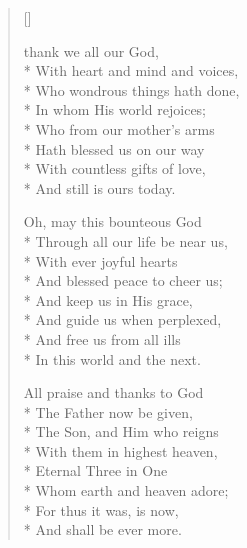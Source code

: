 \newHymn


\begin{verse}[\versewidth]

\begin{altverse}
 thank we all our God,\\*
With heart and mind and voices,\\*
Who wondrous things hath done,\\*
In whom His world rejoices;\\*
Who from our mother's arms\\*
Hath blessed us on our way\\*
With countless gifts of love,\\*
And still is ours today.
\end{altverse}

\begin{altverse}
Oh, may this bounteous God\\*
Through all our life be near us,\\*
With ever joyful hearts\\*
And blessed peace to cheer us;\\*
And keep us in His grace,\\*
And guide us when perplexed,\\*
And free us from all ills\\*
In this world and the next.
\end{altverse}

\begin{altverse}
All praise and thanks to God\\*
The Father now be given,\\*
The Son, and Him who reigns\\*
With them in highest heaven,\\*
Eternal Three in One\\*
Whom earth and heaven adore;\\*
For thus it was, is now,\\*
And shall be ever more.
\end{altverse}

\end{verse}

